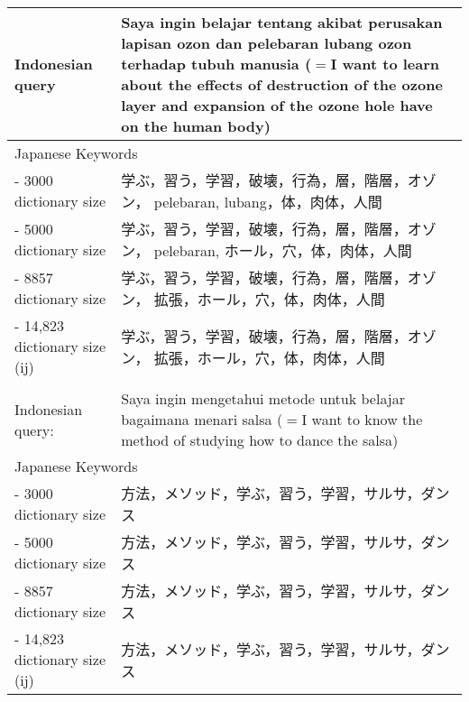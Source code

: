 \documentclass[english]{jnlp_1.3c}
\begin{document}
\begin{table}[t]
  \label{table:7}
   \begin{tabular}{|l|l|}\hline
      \multicolumn{1}{|p{13em}|}{Indonesian query}
    &    \multicolumn{1}{|p{30em}|}{Saya ingin belajar tentang akibat
    perusakan lapisan ozon dan pelebaran lubang 
    ozon terhadap tubuh manusia ($=$I want to learn about the
    effects of destruction of the ozone layer and expansion of the ozone
    hole have on the human body)}   \\  \hline
     \multicolumn{2}{|l|}{Japanese Keywords} \\ \hline
    \multicolumn{1}{|p{13em}|}{- 3000 dictionary size}
    &    \multicolumn{1}{|p{30em}|}{学ぶ，習う，学習，破壊，行為，層，階層，オゾン，
    pelebaran, lubang，体，肉体，人間}   \\  \hline
     \multicolumn{1}{|p{13em}|}{- 5000 dictionary size}
    &    \multicolumn{1}{|p{30em}|}{学ぶ，習う，学習，破壊，行為，層，階層，オゾン，
    pelebaran, ホール，穴，体，肉体，人間}   \\  \hline
      \multicolumn{1}{|p{13em}|}{- 8857 dictionary size}
    &    \multicolumn{1}{|p{30em}|}{学ぶ，習う，学習，破壊，行為，層，階層，オゾン，
    拡張，ホール，穴，体，肉体，人間}   \\  \hline
      \multicolumn{1}{|p{13em}|}{- 14,823 dictionary size (ij)}
    &    \multicolumn{1}{|p{30em}|}{学ぶ，習う，学習，破壊，行為，層，階層，オゾン，
    拡張，ホール，穴，体，肉体，人間}   \\  \hline
    
     \multicolumn{2}{|l|}{} \\ \hline
    \multicolumn{1}{|p{13em}|}{Indonesian query:}
    &    \multicolumn{1}{|p{30em}|}{Saya ingin mengetahui metode untuk
    belajar bagaimana menari salsa ($=$I want to know the method of
    studying how to dance the salsa)}   \\  \hline
     \multicolumn{2}{|l|}{Japanese Keywords} \\ \hline
    \multicolumn{1}{|p{13em}|}{- 3000 dictionary size}
    &    \multicolumn{1}{|p{30em}|}{方法，メソッド，学ぶ，習う，学習，サルサ，ダンス}   \\  \hline
     \multicolumn{1}{|p{13em}|}{- 5000 dictionary size}
    &    \multicolumn{1}{|p{30em}|}{方法，メソッド，学ぶ，習う，学習，サルサ，ダンス}   \\  \hline
      \multicolumn{1}{|p{13em}|}{- 8857 dictionary size}
    &    \multicolumn{1}{|p{30em}|}{方法，メソッド，学ぶ，習う，学習，サルサ，ダンス}   \\  \hline
      \multicolumn{1}{|p{13em}|}{- 14,823 dictionary size (ij)}
    &    \multicolumn{1}{|p{30em}|}{方法，メソッド，学ぶ，習う，学習，サルサ，ダンス}   \\  \hline
   \end{tabular}
\end{table}
\end{document}
